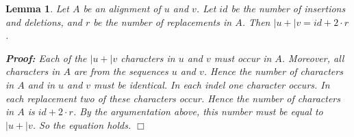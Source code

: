 \documentclass[12pt,a4paper]{scrartcl}
\newcommand{\AllReps}{r}
\newcommand{\Indels}{id}
\newcommand{\Size}[1]{|#1}
\newcounter{Lemmacounter}
\newtheorem{myLemma}[Lemmacounter]{Lemma}
\newcommand{\AfterNumber}{}
\newcommand{\Skiptheorem}{\smallskipamount}
\newcommand{\StartFormal}[1]{\par\addvspace{\Skiptheorem}\noindent\textbf{#1}}
\newcommand{\EndFormal}{\par\addvspace{\Skiptheorem}}
\newenvironment{Lemma}{\begin{myLemma}\AfterNumber}{\end{myLemma}}
\newenvironment{Proof}{\StartFormal{Proof:}}{\EndFormal}
\begin{document}
\def\FirstMultisetSymbol{a} 
\def\SecondMultisetSymbol{b}
\def\ThirdMultisetSymbol{c}


\begin{Lemma}
\label{Relatesequencelength2editoperations}
Let \(A\) be an alignment of \(u\) and \(v\). Let \(\Indels\) be the number of
insertions and deletions, and \(\AllReps\) be the number of replacements in
\(A\). Then \(\Size{u}+\Size{v}=\Indels+2\cdot\AllReps\).
\begin{Proof}
Each of the \(\Size{u}+\Size{v}\) characters in \(u\) and \(v\) must occur in
\(A\). Moreover, all characters in \(A\) are from the sequences \(u\) and
\(v\). Hence the number of characters in \(A\) and in \(u\) and \(v\) must
be identical. In each indel one character occurs.
In each replacement two of these characters occur. Hence the number of
characters in \(A\) is \(\Indels+2\cdot\AllReps\). By the argumentation above,
this number must be equal to \(\Size{u}+\Size{v}\). So the equation holds.
\(\Box\)
\end{Proof}
\end{Lemma}
\end{document}
